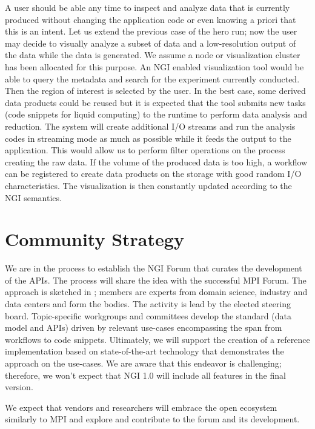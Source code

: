 \documentclass[a4paper, twocolumn]{article}
\begin{document}
A user should be able any time to inspect and analyze data that is currently produced without changing the application code or even knowing a priori that this is an intent.
Let us extend the previous case of the hero run; now the user may decide to visually analyze a subset of data and a low-resolution output of the data while the data is generated.
We assume a node or visualization cluster has been allocated for this purpose.
An NGI enabled visualization tool would be able to query the metadata and search for the experiment currently conducted.
Then the region of interest is selected by the user.
In the best case, some derived data products could be reused but it is expected that the tool submits new tasks (code snippets for liquid computing) to the runtime to perform data analysis and reduction.
The system will create additional I/O streams and run the analysis codes in streaming mode as much as possible while it feeds the output to the application.
This would allow us to perform filter operations on the process creating the raw data.
If the volume of the produced data is too high, a workflow can be registered to create data products on the storage with good random I/O characteristics.
The visualization is then constantly updated according to the NGI semantics.



\section{Community Strategy}
\label{sec:community}

We are in the process to establish the NGI Forum that curates the development of the APIs.
The process will share the idea with the successful MPI Forum.
The approach is sketched in ;
members are experts from domain science, industry and data centers and form the bodies.
The activity is lead by the elected steering board.
Topic-specific workgroups and committees develop the standard (data model and APIs) driven by relevant use-cases encompassing the span from workflows to code snippets.
Ultimately, we will support the creation of a reference implementation based on state-of-the-art technology that demonstrates the approach on the use-cases.
We are aware that this endeavor is challenging; therefore, we won't expect that NGI 1.0 will include all features in the final version.

We expect that vendors and researchers will embrace the open ecosystem similarly to MPI and explore and contribute to the forum and its development.
\end{document}
